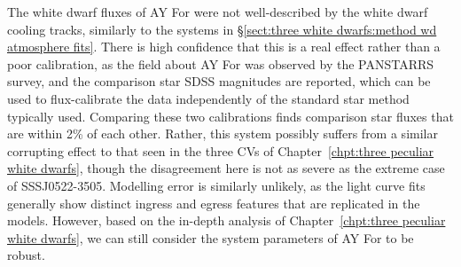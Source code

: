 The white dwarf fluxes of AY For were not well-described by the white dwarf cooling tracks, similarly to the systems in \S\ref{sect:three white dwarfs:method wd atmosphere fits}. There is high confidence that this is a real effect rather than a poor calibration, as the field about AY For was observed by the PANSTARRS survey, and the comparison star SDSS magnitudes are reported, which can be used to flux-calibrate the data independently of the standard star method typically used. Comparing these two calibrations finds comparison star fluxes that are within 2\% of each other. Rather, this system possibly suffers from a similar corrupting effect to that seen in the three CVs of Chapter~\ref{chpt:three peculiar white dwarfs}, though the disagreement here is not as severe as the extreme case of SSSJ0522-3505. Modelling error is similarly unlikely, as the light curve fits generally show distinct ingress and egress features that are replicated in the models. However, based on the in-depth analysis of Chapter~\ref{chpt:three peculiar white dwarfs}, we can still consider the system parameters of AY For to be robust.


%     

